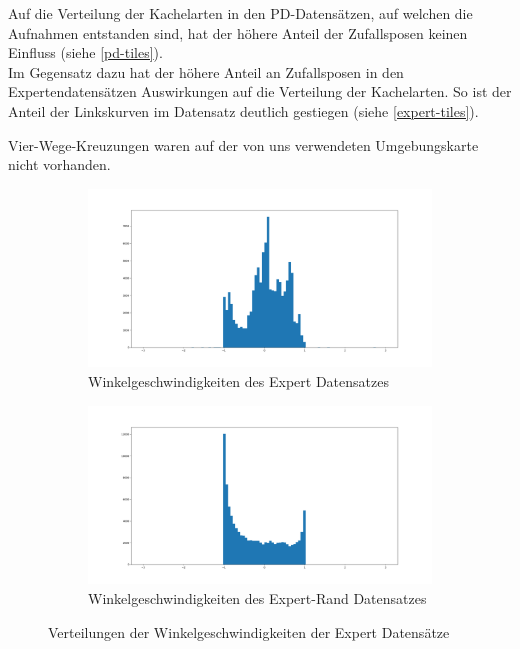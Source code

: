 Auf die Verteilung der Kachelarten in den PD-Datensätzen, auf welchen die Aufnahmen entstanden sind, hat der höhere Anteil der Zufallsposen keinen Einfluss (siehe \ref{pd-tiles}).\\
Im Gegensatz dazu hat der höhere Anteil an Zufallsposen in den Expertendatensätzen Auswirkungen auf die Verteilung der Kachelarten. So ist der Anteil der Linkskurven im Datensatz deutlich gestiegen (siehe \ref{expert-tiles}).

Vier-Wege-Kreuzungen waren auf der von uns verwendeten Umgebungskarte nicht vorhanden.

\begin{figure}[H]
	\centering
	\begin{subfigure}{0.5\textwidth}
		\centering
		\includegraphics[width=\linewidth]{kapitel4/images/plots/expert-angular_velocities.png}
		\caption{Winkelgeschwindigkeiten des Expert Datensatzes}
		\label{expert-angular}
	\end{subfigure}%
	\begin{subfigure}{0.5\textwidth}
		\centering
		\includegraphics[width=\linewidth]{kapitel4/images/plots/expert-random-angular_velocities.png}
		\caption{Winkelgeschwindigkeiten des Expert-Rand Datensatzes}
		\label{expert-rand-angular}
	\end{subfigure}
	\caption{Verteilungen der Winkelgeschwindigkeiten der Expert Datensätze}
	\label{expert-angles}
\end{figure}


